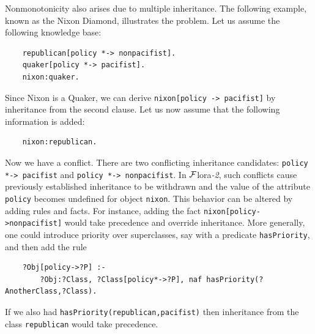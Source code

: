\documentclass[11pt]{article}
\newcommand{\FLORA}{{\mbox{\sc ${\cal F}${lora}\rm\emph{-2}}}\xspace}
\begin{document}
Nonmonotonicity also arises due to multiple inheritance. The following
example, known as the Nixon Diamond, illustrates the problem. Let us assume
the following knowledge base:
\begin{verbatim}
    republican[policy *-> nonpacifist].
    quaker[policy *-> pacifist].
    nixon:quaker.
\end{verbatim}
Since Nixon is a Quaker, we can derive {\tt nixon[policy -> pacifist]}
by inheritance from the second clause. Let us now assume that the following
information is added:
\begin{verbatim}
    nixon:republican.  
\end{verbatim}
Now we have a conflict. There are two conflicting inheritance candidates:
{\tt policy *-> pacifist} and {\tt policy *-> nonpacifist}.    
In \FLORA, such conflicts cause previously established inheritance
to be withdrawn and the value of the attribute {\tt policy} becomes
undefined for object {\tt nixon}.
This behavior can be altered by adding rules and facts. For instance,
adding the fact {\tt nixon[policy->nonpacifist]} would take precedence and override
inheritance. More generally, one could introduce priority over superclasses, say with  
  a predicate {\tt hasPriority}, and then add the rule
\begin{verbatim}
    ?Obj[policy->?P] :-
        ?Obj:?Class, ?Class[policy*->?P], naf hasPriority(?AnotherClass,?Class).
\end{verbatim}
If we also had {\tt hasPriority(republican,pacifist)} then inheritance from
the class {\tt republican} would take precedence. 
\end{document}
